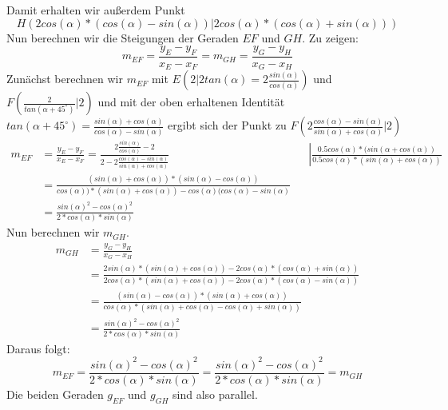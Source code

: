 \documentclass{article}
\numberwithin{equation}{section}
\begin{document}
	Damit erhalten wir außerdem Punkt \[H\left(2cos(\alpha)*(cos(\alpha)-sin(\alpha))\left|2cos(\alpha)*(cos(\alpha)+sin(\alpha))\right.\right)\]
	Nun berechnen wir die Steigungen der Geraden $EF$ und $GH$.
	Zu zeigen: 
	\[m_{EF}=\frac{y_E-y_F}{x_E-x_F} = m_{GH}=\frac{y_G-y_H}{x_G-x_H}\]
	Zunächst berechnen wir $m_{EF}$ mit $E(2|2tan(\alpha)=2\frac{sin(\alpha)}{cos(\alpha)})$ und $F(\frac{2}{tan(\alpha+45^{\circ})}|2)$ und mit der oben erhaltenen Identität $tan(\alpha+45^{\circ})=\frac{sin(\alpha)+cos(\alpha)}{cos(\alpha)-sin(\alpha)}$ ergibt sich der Punkt zu $F(2\frac{cos(\alpha)-sin(\alpha)}{sin(\alpha)+cos(\alpha)}|2)$
	\begin{align*}
		m_{EF}&=\frac{y_E-y_F}{x_E-x_F}=\frac{2\frac{sin(\alpha)}{cos(\alpha)}-2}{2-2\frac{cos(\alpha)-sin(\alpha)}{sin(\alpha)+cos(\alpha)}}&&\left|\frac{0.5cos(\alpha)*(sin(\alpha+cos(\alpha))}{0.5cos(\alpha)*(sin(\alpha)+cos(\alpha))}\right.\\
		&=\frac{(sin(\alpha)+cos(\alpha))*(sin(\alpha)-cos(\alpha))}{cos(\alpha))*(sin(\alpha)+cos(\alpha))-cos(\alpha)(cos(\alpha)-sin(\alpha)}\\
		&=\frac{sin(\alpha)^2-cos(\alpha)^2}{2*cos(\alpha)*sin(\alpha)}
	\end{align*}
	Nun berechnen wir $m_{GH}$.
	\begin{align*}
		m_{GH}&=\frac{y_G-y_H}{x_G-x_H}\\
		&=\frac{2sin(\alpha)*(sin(\alpha)+cos(\alpha))-2cos(\alpha)*(cos(\alpha)+sin(\alpha))}{2cos(\alpha)*(sin(\alpha)+cos(\alpha))-2cos(\alpha)*(cos(\alpha)-sin(\alpha))}\\
		&=\frac{(sin(\alpha)-cos(\alpha))*(sin(\alpha)+cos(\alpha))}{cos(\alpha)*(sin(\alpha)+cos(\alpha)-cos(\alpha)+sin(\alpha))}\\
		&=\frac{sin(\alpha)^2-cos(\alpha)^2}{2*cos(\alpha)*sin(\alpha)}
	\end{align*}
	Daraus folgt: \[m_{EF}=\frac{sin(\alpha)^2-cos(\alpha)^2}{2*cos(\alpha)*sin(\alpha)}=\frac{sin(\alpha)^2-cos(\alpha)^2}{2*cos(\alpha)*sin(\alpha)}=m_{GH}\]
	Die beiden Geraden $g_{EF}$ und $g_{GH}$ sind also parallel.
\newpage
\end{document}
